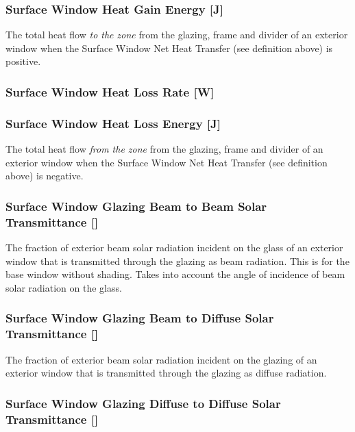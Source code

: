 \subsubsection{Surface Window Heat Gain Energy {[}J{]}}\label{surface-window-heat-gain-energy-j}

The total heat flow \emph{to the zone} from the glazing, frame and divider of an exterior window when the Surface Window Net Heat Transfer (see definition above) is positive.

\subsubsection{Surface Window Heat Loss Rate {[}W{]}}\label{surface-window-heat-loss-rate-w}

\subsubsection{Surface Window Heat Loss Energy {[}J{]}}\label{surface-window-heat-loss-energy-j}

The total heat flow \emph{from the zone} from the glazing, frame and divider of an exterior window when the Surface Window Net Heat Transfer (see definition above) is negative.

\subsubsection{Surface Window Glazing Beam to Beam Solar Transmittance {[]}}\label{surface-window-glazing-beam-to-beam-solar-transmittance}

The fraction of exterior beam solar radiation incident on the glass of an exterior window that is transmitted through the glazing as beam radiation. This is for the base window without shading. Takes into account the angle of incidence of beam solar radiation on the glass.

\subsubsection{Surface Window Glazing Beam to Diffuse Solar Transmittance {[]}}\label{surface-window-glazing-beam-to-diffuse-solar-transmittance}

The fraction of exterior beam solar radiation incident on the glazing of an exterior window that is transmitted through the glazing as diffuse radiation.

\subsubsection{Surface Window Glazing Diffuse to Diffuse Solar Transmittance {[]}}\label{surface-window-glazing-diffuse-to-diffuse-solar-transmittance}

